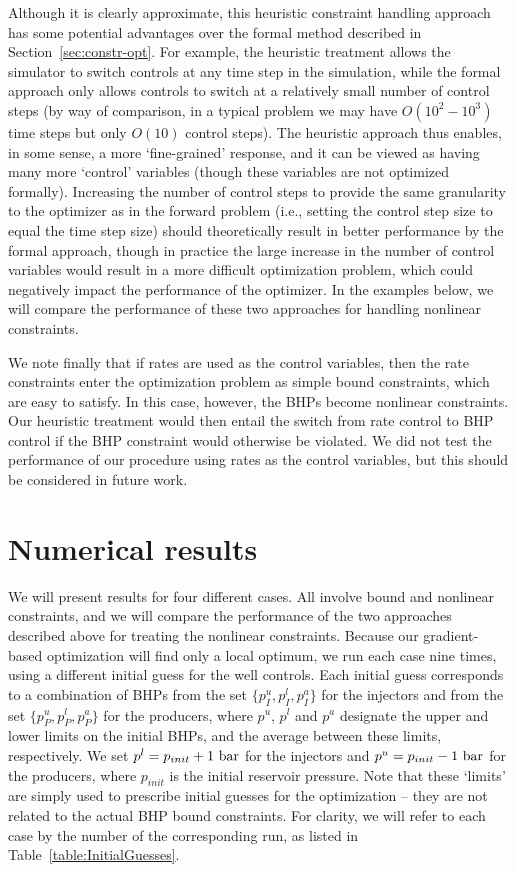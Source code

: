 Although it is clearly approximate, this heuristic constraint handling approach
has some potential advantages over the formal method described in
Section~\ref{sec:constr-opt}. For example, the heuristic treatment allows the
simulator to switch controls at any time step in the simulation, while the
formal approach only allows controls to switch at a relatively small number of
control steps (by way of comparison, in a typical problem we may have
  $O(10^2-10^3)$ time steps but only $O(10)$ control steps). The heuristic
approach thus enables, in some sense, a more `fine-grained' response, and it can
be viewed as having many more `control' variables (though these variables are
  not optimized formally). Increasing the number of control steps to provide the
same granularity to the optimizer as in the forward problem (i.e., setting the
  control step size to equal the time step size) should theoretically result in
better performance by the formal approach, though in practice the large
increase in the number of control variables would result in a more difficult optimization
problem, which could negatively impact the performance of the optimizer. In the examples
below, we will compare the performance of these two approaches for handling
nonlinear constraints.

We note finally that if rates are used as the control variables, then the rate
constraints enter the optimization problem as simple bound constraints, which
are easy to satisfy. In this case, however, the BHPs become nonlinear
constraints. Our heuristic treatment would then entail the switch from rate
control to BHP control if the BHP constraint would otherwise be violated. We did
not test the performance of our procedure using rates as the control variables,
but this should be considered in future work.



\section{Numerical results}  \label{sec:results}

We will present results for four different cases. All involve bound and
nonlinear constraints, and we will compare the performance of the two approaches
described above for treating the nonlinear constraints. Because our
gradient-based optimization will find only a local optimum, we run each case
nine times, using a different initial guess for the well controls. Each initial
guess corresponds to a combination of BHPs from the set $\{p_I^u,p_I^l,p_I^a\}$
for the injectors and from the set $\{p_P^u,p_P^l,p_P^a\}$ for the producers,
where $p^u$, $p^l$ and $p^a$ designate the upper and lower limits on the
initial BHPs, and the average between these limits, respectively. We set
$p^l=p_{init}+1~{\rm bar}$ for the injectors and $p^u=p_{init}-1~{\rm bar}$
for the producers, where $p_{init}$ is the initial reservoir pressure. Note
that these `limits' are simply used to prescribe initial guesses for the
optimization -- they are not related to the actual BHP bound constraints.
For clarity, we will refer to each case by the number of the corresponding
run, as listed in Table~\ref{table:InitialGuesses}.






